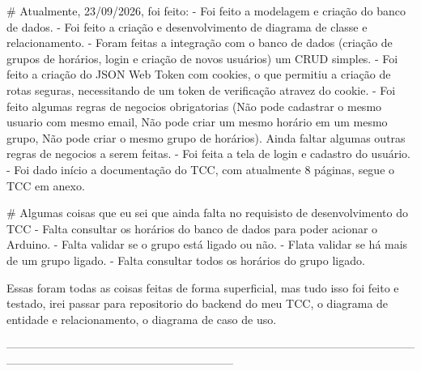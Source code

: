 # Atualmente, 23/09/2026, foi feito:
- Foi feito a modelagem e criação do banco de dados.
- Foi feito a criação e desenvolvimento de diagrama de classe e relacionamento.
- Foram feitas a integração com o banco de dados (criação de grupos de horários, login e criação de novos usuários) um CRUD simples.
- Foi feito a criação do JSON Web Token com cookies, o que permitiu a criação de rotas seguras, necessitando de um token de verificação atravez do cookie.
- Foi feito algumas regras de negocios obrigatorias (Não pode cadastrar o mesmo usuario com mesmo email, Não pode criar um mesmo horário em um mesmo grupo, Não pode criar o mesmo grupo de horários). Ainda faltar algumas outras regras de negocios a serem feitas.
- Foi feita a tela de login e cadastro do usuário.
- Foi dado início a documentação do TCC, com atualmente 8 páginas, segue o TCC em anexo.

# Algumas coisas que eu sei que ainda falta no requisisto de desenvolvimento do TCC
- Falta consultar os horários do banco de dados para poder acionar o Arduino.
- Falta validar se o grupo está ligado ou não.
- Flata validar se há mais de um grupo ligado.
- Falta consultar todos os horários do grupo ligado.

Essas foram todas as coisas feitas de forma superficial, mas tudo isso foi feito e testado, irei passar para repositorio do backend do meu TCC, o diagrama de entidade e relacionamento, o diagrama de caso de uso.

------------------------------------------------------------------------------------------------------------------------------------------------------------------------


